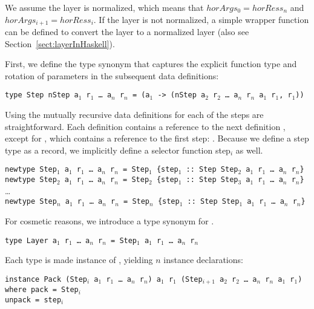 \documentclass[preprint,natbib]{sigplanconf}
\begin{document}
We assume the layer is normalized, which means that $horArgs_{0} = horRess_n$ and 
$horArgs_{i+1} = horRess_i$. If the layer is not normalized, a simple wrapper function can be defined to convert the layer to a normalized layer (also see Section~\ref{sect:layerInHaskell}).


First, we define the  type synonym that captures the explicit function type and rotation of parameters in the subsequent data definitions:

\begin{small}
\begin{tabbing}
{\tt type St}\={\tt ep nStep a$_1$ r$_1$ \dots~a$_n$ r$_n$ = (a$_1$ -> (nStep a$_2$ r$_2$ \dots~a$_n$ r$_n$ a$_1$ r$_1$, r$_1$))}
\end{tabbing}
\end{small}

Using  the mutually recursive data definitions for each of the steps are straightforward. Each definition  contains a reference to the next definition , except for , which contains a reference to the first step: . Because we define a step type as a record, we implicitly define a selector function {step$_i$} as well.

\begin{small}
{\tt newtype Step$_1$ a$_1$ r$_1$ \dots~a$_n$ r$_n$ = Step$_1$ \{step$_1$}\verb| :: |{\tt Step Step$_2$ a$_1$ r$_1$ \dots~a$_n$ r$_n$\}}\\
{\tt newtype Step$_2$ a$_1$ r$_1$ \dots~a$_n$ r$_n$ = Step$_2$ \{step$_1$}\verb| :: |{\tt Step Step$_3$ a$_1$ r$_1$ \dots~a$_n$ r$_n$\}}\\
\dots \\
{\tt newtype Step$_n$ a$_1$ r$_1$ \dots~a$_n$ r$_n$ = Step$_n$ \{step$_1$}\verb| :: |{\tt Step Step$_1$ a$_1$ r$_1$ \dots~a$_n$ r$_n$\}}
\end{small}

For cosmetic reasons, we introduce a type synonym  for .

{\tt type Layer a$_1$ r$_1$ \dots~a$_n$ r$_n$ = Step$_1$ a$_1$ r$_1$ \dots~a$_n$ r$_n$}

Each  type is made instance of , yielding $n$ instance declarations:

\begin{small}
\begin{tabbing}
{\tt i}\={\tt nstance Pack (Step$_i$ a$_1$ r$_1$ \dots~a$_n$  r$_n$) a$_1$ r$_1$ (Step$_{i+1}$ a$_2$ r$_2$ \dots~a$_n$ r$_n$ a$_1$ r$_1$)}\\
\> {\tt where }\={\tt pack = Step$_i$}\\
\>\> {\tt unpack = step$_i$}
\end{tabbing}
\end{small}
\end{document}
